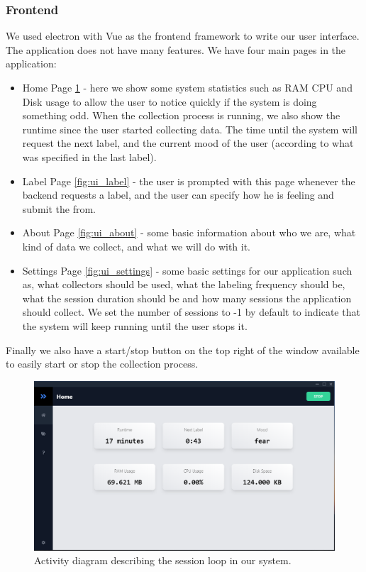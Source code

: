 \subsubsection{Frontend}

We used electron with Vue as the frontend framework to write our user interface. 
The application does not have many features. We have four main pages in the application:

\begin{itemize}
    \item Home Page \ref{fig:ui_home} - here we show some system statistics such as RAM CPU and Disk usage to allow the user to notice quickly if the system is 
        doing something odd. When the collection process is running, we also show the runtime since the user started collecting data.
        The time until the system will request the next label, and the current mood of the user (according to what was specified in the last label).
    \item Label Page \ref{fig:ui_label} - the user is prompted with this page whenever the backend requests a label, and the user can specify how he is feeling and submit the from.
    \item About Page \ref{fig:ui_about} - some basic information about who we are, what kind of data we collect, and what we will do with it.
    \item Settings Page \ref{fig:ui_settings} - some basic settings for our application such as, what collectors should be used, what the labeling frequency should be, what 
        the session duration should be and how many sessions the application should collect.
        We set the number of sessions to -1 by default to indicate that the system will keep running until the user stops it.

\end{itemize}

Finally we also have a start/stop button on the top right of the window available to easily start or stop the collection process.

\begin{figure}[htp]
    \centering
    \includegraphics[width=14cm]{figures/ui_home}   
    \caption{Activity diagram describing the session loop in our system.}
    \label{fig:ui_home} 
\end{figure}

